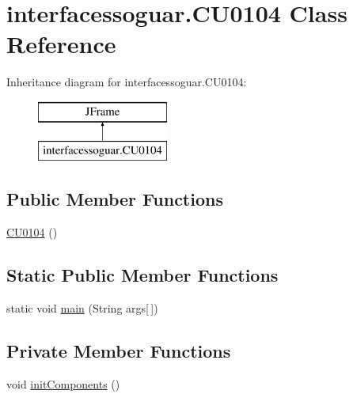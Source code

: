 \hypertarget{classinterfacessoguar_1_1_c_u0104}{}\section{interfacessoguar.\+C\+U0104 Class Reference}
\label{classinterfacessoguar_1_1_c_u0104}
Inheritance diagram for interfacessoguar.\+C\+U0104\+:\begin{figure}[H]
\begin{center}
\leavevmode
\includegraphics[height=2.000000cm]{classinterfacessoguar_1_1_c_u0104}
\end{center}
\end{figure}
\subsection*{Public Member Functions}
\begin{DoxyCompactItemize}
\item 
\mbox{\hyperlink{classinterfacessoguar_1_1_c_u0104_a0c70e4d803dc65276f8109fa7f5b9896}{C\+U0104}} ()
\end{DoxyCompactItemize}
\subsection*{Static Public Member Functions}
\begin{DoxyCompactItemize}
\item 
static void \mbox{\hyperlink{classinterfacessoguar_1_1_c_u0104_ac2de31f3c8284cc25328331239a9a94d}{main}} (String args\mbox{[}$\,$\mbox{]})
\end{DoxyCompactItemize}
\subsection*{Private Member Functions}
\begin{DoxyCompactItemize}
\item 
void \mbox{\hyperlink{classinterfacessoguar_1_1_c_u0104_a0fc3161c12feb33b56367fb1823448d4}{init\+Components}} ()
\end{DoxyCompactItemize}
